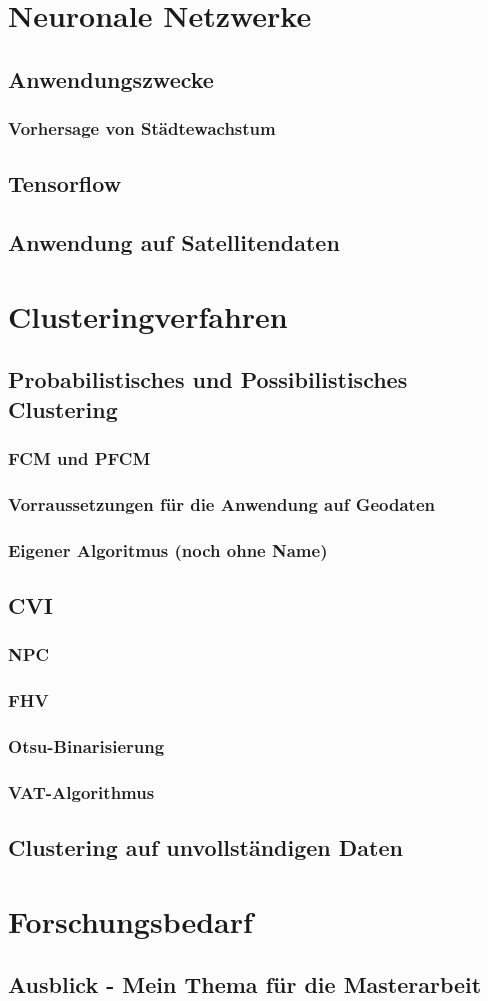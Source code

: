 \documentclass[11pt,fleqn]{book} %
\begin{document}
\chapter{Neuronale Netzwerke}
\section{Anwendungszwecke}
\subsection{Vorhersage von Städtewachstum}
\section{Tensorflow}
\section{Anwendung auf Satellitendaten}


\chapter{Clusteringverfahren}
\section{Probabilistisches und Possibilistisches Clustering}
\subsection{FCM und PFCM}
\subsection{Vorraussetzungen für die Anwendung auf Geodaten}
\subsection{Eigener Algoritmus (noch ohne Name)}
\section{CVI}
\subsection{NPC}
\subsection{FHV}
\subsection{Otsu-Binarisierung}
\subsection{VAT-Algorithmus}
\section{Clustering auf unvollständigen Daten}
\chapter{Forschungsbedarf}
\section{Ausblick - Mein Thema für die Masterarbeit}

\vfill
\end{document}
